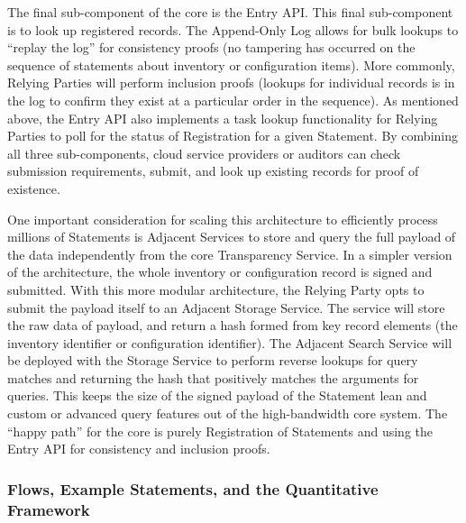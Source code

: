 \documentclass{jdf}
\begin{document}
The final sub-component of the core is the Entry API. This final sub-component is to look up registered records. The Append-Only Log allows for bulk lookups to ``replay the log'' for consistency proofs (no tampering has occurred on the sequence of statements about inventory or configuration items). More commonly, Relying Parties will perform inclusion proofs (lookups for individual records is in the log to confirm they exist at a particular order in the sequence). As mentioned above, the Entry API also implements a task lookup functionality for Relying Parties to poll for the status of Registration for a given Statement. By combining all three sub-components, cloud service providers or auditors can check submission requirements, submit, and look up existing records for proof of existence.

One important consideration for scaling this architecture to efficiently process millions of Statements is Adjacent Services to store and query the full payload of the data independently from the core Transparency Service. In a simpler version of the architecture, the whole inventory or configuration record is signed and submitted. With this more modular architecture, the Relying Party opts to submit the payload itself to an Adjacent Storage Service. The service will store the raw data of payload, and return a hash formed from key record elements (the inventory identifier or configuration identifier). The Adjacent Search Service will be deployed with the Storage Service to perform reverse lookups for query matches and returning the hash that positively matches the arguments for queries. This keeps the size of the signed payload of the Statement lean and custom or advanced query features out of the high-bandwidth core system. The ``happy path'' for the core is purely Registration of Statements and using the Entry API for consistency and inclusion proofs.

\subsubsection{Flows, Example Statements, and the Quantitative Framework}
\end{document}
